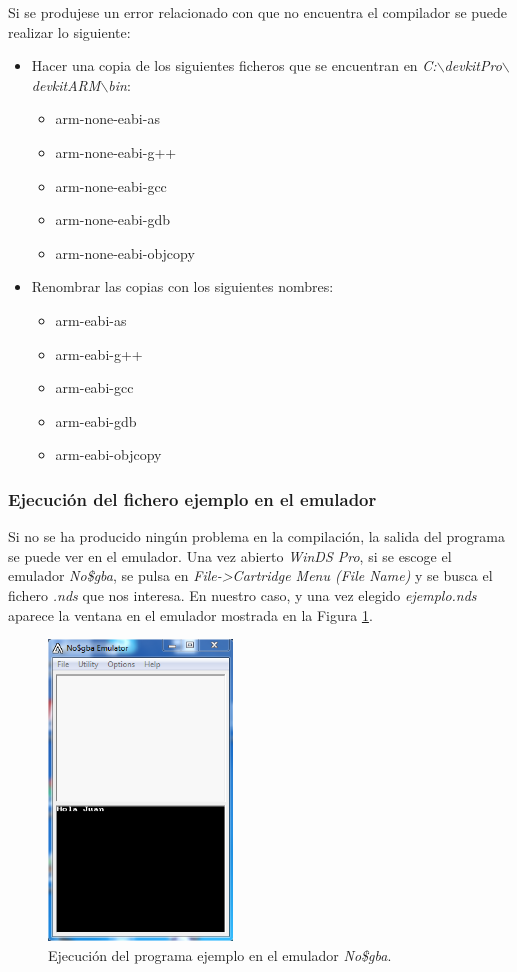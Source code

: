 Si se produjese un error relacionado con que no encuentra el compilador se puede realizar lo siguiente:
\begin{itemize}
\item Hacer una copia de los siguientes ficheros que se encuentran en \textit{C:$\backslash$devkitPro$\backslash$devkitARM$\backslash$bin}:	
	\begin{itemize}
 		\item arm-none-eabi-as
 		\item arm-none-eabi-g++
	 	\item arm-none-eabi-gcc	
 		\item arm-none-eabi-gdb
	   \item arm-none-eabi-objcopy
	\end{itemize}
\item Renombrar las copias con los siguientes nombres:	
	\begin{itemize}
		\item arm-eabi-as
	 	\item arm-eabi-g++
	 	\item arm-eabi-gcc	
 		\item arm-eabi-gdb
	   \item arm-eabi-objcopy
	\end{itemize}
\end{itemize}

\subsubsection{Ejecución del fichero ejemplo en el emulador}
Si no se ha producido ningún problema en la compilación, la salida del programa se puede ver en el emulador. Una vez abierto \textit{WinDS Pro}, si se escoge el emulador \textit{No\$gba}, se pulsa en \textit{File->Cartridge Menu (File Name)} y se busca el fichero \textit{.nds} que nos interesa. En nuestro caso, y una vez elegido \textit{ejemplo.nds} aparece la ventana en el emulador mostrada en la Figura \ref{fig_c2_eclipse11b}.

\begin{figure}[h]
\centering
\includegraphics[height=8cm]{./Figuras/C2/c2_eclipse11b.png}
\caption{Ejecución del programa ejemplo en el emulador \textit{No\$gba}.}
\label{fig_c2_eclipse11b}
\end{figure}

